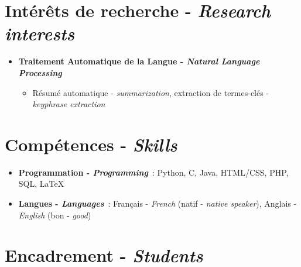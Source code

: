 \documentclass[11pt,a4paper]{moderncv}
\begin{document}
\section{Intérêts de recherche - \textit{Research interests}}

\begin{itemize}[leftmargin=0.5cm,itemsep=-0.1cm]
    \item \textbf{Traitement Automatique de la Langue - \textit{Natural Language 
          Processing}}
    \vspace*{-0.3cm}
    \begin{itemize}
        \item Résumé automatique - \textit{summarization}, extraction de 
              termes-clés - \textit{keyphrase extraction}
    \end{itemize}
\end{itemize}

\section{Compétences - \textit{Skills}}

\begin{itemize}[leftmargin=0.5cm,itemsep=-0.1cm]
    \item \textbf{Programmation - \textit{Programming}}~: Python, C, Java, 
          HTML/CSS, PHP, SQL, \LaTeX
    \item \textbf{Langues - \textit{Languages}}~: Français - \textit{French} 
          (natif - \textit{native speaker}),  Anglais - \textit{English} (bon - 
          \textit{good})
\end{itemize}


\section{Encadrement - \textit{Students}}
\end{document}
